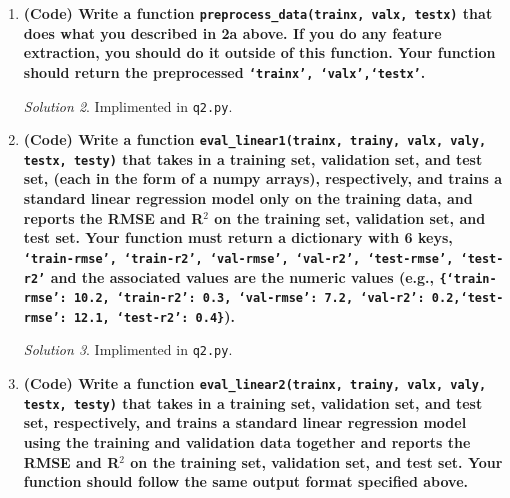 \documentclass[a4paper,12pt]{article}
\theoremstyle{definition}
\theoremstyle{remark}
\newtheorem*{solution}{Solution}
\begin{document}
\begin{enumerate}
\begin{enumerate}
\begin{solution}
			The above method worked for all of the arguments (columns of the matrix) except for the `date' column. This is because the date data is stored as a string \texttt{`YYYY-MM-DD\ HH:MM:SS'}, which as a non-numeric argument cannot be normalized. The first step to resolve this is to use the \textsc{Pandas} method \texttt{.todatetime()}, which will convert this date data into a more standard numeric format of \texttt{'M/D/YY H:MM'}. The data type for this was \texttt{datetime64[ns]}. Then to make sure that this was a numeric value (\texttt{float64}), I then used the \textsc{Pandas} method \texttt{.tonumeric()}, which then converted that datatime feature to the number of nanoseconds since a predefined time in the past (called the `UNIX epoch'). To compensate for that, I divided the answer by $6e10$ so that the data would be in minutes since the UNIX epoch. This data manipulation then allowed my \texttt{preprocesss\_data} function to work on all arguments.
		\end{solution}
		\item {\bf  (Code) Write a function \texttt{preprocess\_data(trainx, valx, testx)} that does what you described in 2a above. If you do any feature extraction, you should do it outside of this function. Your function should return the preprocessed \texttt{`trainx', `valx',`testx'}.}
		\begin{solution}
			Implimented in \texttt{q2.py}.
		\end{solution}
		\item {\bf (Code) Write a function \texttt{eval\_linear1(trainx, trainy, valx, valy, testx, testy)}	that takes in a training set, validation set, and test set, (each in the form of a numpy arrays), respectively, and trains a standard linear regression model only on the training data, and reports the RMSE and R$^2$ on the training set, validation set, and test set. Your function must return a dictionary with 6 keys, \texttt{‘train-rmse’, ‘train-r2’, ‘val-rmse’, ‘val-r2’, ‘test-rmse’, ‘test-r2’} and the associated values are the numeric values (e.g., \texttt{\{‘train-rmse’: 10.2, ‘train-r2’: 0.3, ‘val-rmse’: 7.2, ‘val-r2’: 0.2,‘test-rmse’: 12.1, ‘test-r2’: 0.4\}}).}
		\begin{solution}
			Implimented in \texttt{q2.py}.
		\end{solution}
		\item {\bf(Code) Write a function \texttt{eval\_linear2(trainx, trainy, valx, valy, testx, testy)} that takes in a training set, validation set, and test set, respectively, and trains a standard linear regression model using the training and validation data together and reports the RMSE and R$^2$ on the training set, validation set, and test set. Your function should follow the same output format specified above.}

\end{enumerate}
\end{enumerate}
\end{document}
